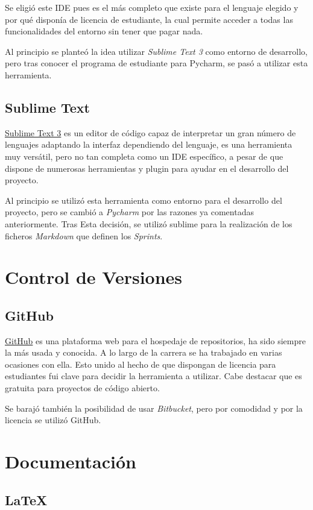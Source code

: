 Se eligió este IDE pues es el más completo que existe para el lenguaje elegido y por qué disponía de licencia de estudiante, la cual permite acceder a todas las funcionalidades del entorno sin tener que pagar nada.

Al principio se planteó la idea utilizar \emph{Sublime Text 3} como entorno de desarrollo, pero tras conocer el programa de estudiante para Pycharm, se pasó a utilizar esta herramienta.

\subsection{Sublime Text}
\href{https://www.sublimetext.com/}{Sublime Text 3} es un editor de código capaz de interpretar un gran número de lenguajes adaptando la interfaz dependiendo del lenguaje, es una herramienta muy versátil, pero no tan completa como un IDE específico, a pesar de que dispone de numerosas herramientas y plugin para ayudar en el desarrollo del proyecto.

Al principio se utilizó esta herramienta como entorno para el desarrollo del proyecto, pero se cambió a \emph{Pycharm} por las razones ya comentadas anteriormente. Tras Esta decisión, se utilizó sublime para la realización de los ficheros \emph{Markdown} que definen los \emph{Sprints}.

\section{Control de Versiones}
\subsection{GitHub}
\href{https://github.com/}{GitHub} es una plataforma web para el hospedaje de repositorios, ha sido siempre la más usada y conocida. A lo largo de la carrera se ha trabajado en varias ocasiones con ella. Esto unido al hecho de que dispongan de licencia para estudiantes fui clave para decidir la herramienta a utilizar. Cabe destacar que es gratuita para proyectos de código abierto.

Se barajó también la posibilidad de usar \emph{Bitbucket}, pero por comodidad y por la licencia se utilizó GitHub.

\section{Documentación}
\subsection{LaTeX}\label{latex}

